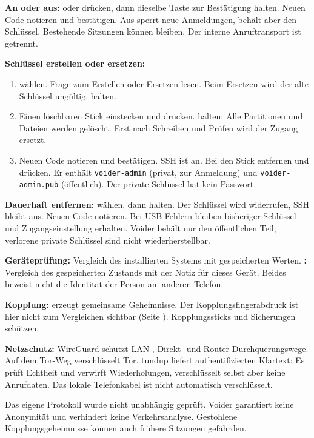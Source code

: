 \textbf{An oder aus:}  oder  drücken, dann dieselbe Taste zur Bestätigung halten. Neuen Code notieren und bestätigen. Aus sperrt neue Anmeldungen, behält aber den Schlüssel. Bestehende Sitzungen können bleiben. Der interne Anruftransport ist getrennt.

\textbf{Schlüssel erstellen oder ersetzen:}
\begin{enumerate}
\item {} wählen. Frage zum Erstellen oder Ersetzen lesen. Beim Ersetzen wird der alte Schlüssel ungültig.  halten.
\item Einen löschbaren Stick einstecken und  drücken.  halten: Alle Partitionen und Dateien werden gelöscht. Erst nach Schreiben und Prüfen wird der Zugang ersetzt.
\item Neuen Code notieren und bestätigen. SSH ist an. Bei  den Stick entfernen und  drücken. Er enthält \texttt{voider-admin} (privat, zur Anmeldung) und \texttt{voider-admin.pub} (öffentlich). Der private Schlüssel hat kein Passwort.
\end{enumerate}
\textbf{Dauerhaft entfernen:}  wählen, dann  halten. Der Schlüssel wird widerrufen, SSH bleibt aus. Neuen Code notieren. Bei USB-Fehlern bleiben bisheriger Schlüssel und Zugangseinstellung erhalten. Voider behält nur den öffentlichen Teil; verlorene private Schlüssel sind nicht wiederherstellbar.

\textbf{Geräteprüfung:} Vergleich des installierten Systems mit gespeicherten Werten. \textbf{:} Vergleich des gespeicherten Zustands mit der Notiz für dieses Gerät. Beides beweist nicht die Identität der Person am anderen Telefon.

\textbf{Kopplung:} erzeugt gemeinsame Geheimnisse. Der Kopplungsfingerabdruck ist hier nicht zum Vergleichen sichtbar (Seite \pageref{de:add}). Kopplungssticks und Sicherungen schützen.

\textbf{Netzschutz:} WireGuard schützt LAN-, Direkt- und Router-Durchquerungswege. Auf dem Tor-Weg verschlüsselt Tor. tundup liefert authentifizierten Klartext: Es prüft Echtheit und verwirft Wiederholungen, verschlüsselt selbst aber keine Anrufdaten. Das lokale Telefonkabel ist nicht automatisch verschlüsselt.

Das eigene Protokoll wurde nicht unabhängig geprüft. Voider garantiert keine Anonymität und verhindert keine Verkehrsanalyse. Gestohlene Kopplungsgeheimnisse können auch frühere Sitzungen gefährden.

